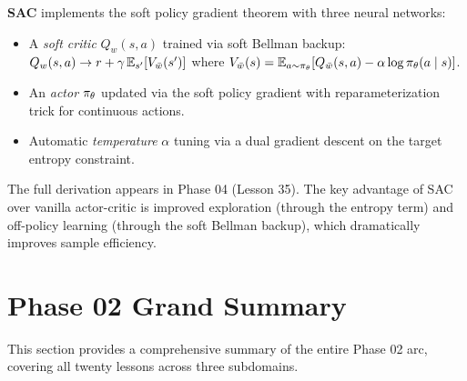 \documentclass[11pt,a4paper]{article}
\begin{document}
\begin{rlconnection}[title={Preview: Soft Actor-Critic (SAC)}]
\textbf{SAC} \citep{haarnoja2018} implements the soft policy gradient
theorem with three neural networks:
\begin{itemize}
  \item A \emph{soft critic} $Q_w(s,a)$ trained via soft Bellman
    backup: $Q_w(s,a) \to r + \gamma\, \mathbb{E}_{s'}[V_{\bar{w}}(s')]$
    where $V_{\bar{w}}(s) = \mathbb{E}_{a \sim \pi_\theta}[Q_{\bar{w}}(s,a)
    - \alpha \log \pi_\theta(a \mid s)]$.
  \item An \emph{actor} $\pi_\theta$ updated via the soft policy
    gradient with reparameterization trick for continuous actions.
  \item Automatic \emph{temperature} $\alpha$ tuning via a dual
    gradient descent on the target entropy constraint.
\end{itemize}
The full derivation appears in Phase 04 (Lesson 35). The key advantage
of SAC over vanilla actor-critic is improved exploration (through the
entropy term) and off-policy learning (through the soft Bellman
backup), which dramatically improves sample efficiency.
\end{rlconnection}

\section{Phase 02 Grand Summary}
\label{sec:grand-summary}

This section provides a comprehensive summary of the entire Phase 02
arc, covering all twenty lessons across three subdomains.
\end{document}
